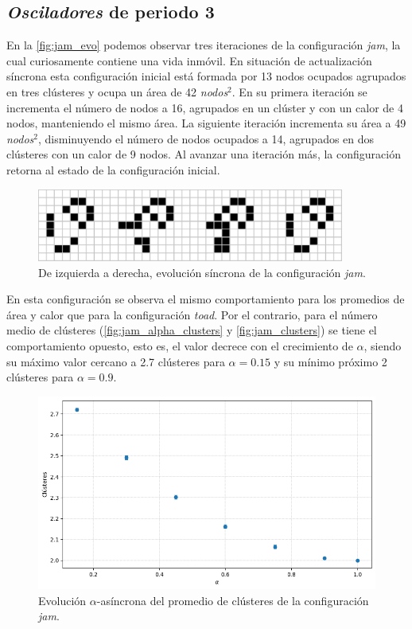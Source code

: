 \documentclass[../proyecto.tex]{memoir}
\begin{document}
\subsection{\textit{Osciladores} de periodo 3}

En la \autoref{fig:jam_evo} podemos observar tres iteraciones de la configuración \textit{jam}, la cual curiosamente contiene una vida inmóvil. En situación de actualización síncrona esta configuración inicial está formada por 13 nodos ocupados agrupados en tres clústeres y ocupa un área de 42 \textit{nodos}$^2$. En su primera iteración se incrementa el número de nodos a 16, agrupados en un clúster y con un calor de 4 nodos, manteniendo el mismo área. La siguiente iteración incrementa su área a 49 \textit{nodos}$^2$, disminuyendo el número de nodos ocupados a 14, agrupados en dos clústeres con un calor de 9 nodos. Al avanzar una iteración más, la configuración retorna al estado de la configuración inicial. 

\begin{figure}[H]
	\centering
    \includegraphics[width=0.9\textwidth]{./images/jam_evo.png}
    \caption{De izquierda a derecha, evolución síncrona de la configuración \textit{jam}.}
    \label{fig:jam_evo}
\end{figure}

En esta configuración se observa el mismo comportamiento para los promedios de área y calor que para la configuración \textit{toad}. Por el contrario, para el número medio de clústeres (\autoref{fig:jam_alpha_clusters} y \autoref{fig:jam_clusters}) se tiene el comportamiento opuesto, esto es, el valor decrece con el crecimiento de $\alpha$, siendo su máximo valor cercano a 2.7 clústeres para $\alpha=0.15$ y su mínimo próximo 2 clústeres para $\alpha=0.9$.

\begin{figure}[H]
	\centering
    \includegraphics[width=\textwidth]{./images/data/jam/alpha_Clusteres.png}
    \caption{Evolución $\alpha$-asíncrona del promedio de clústeres de la configuración \textit{jam}.}
    \label{fig:jam_alpha_clusters}
\end{figure}
\end{document}
